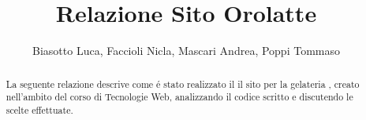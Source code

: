 \documentclass{article}
\title{Relazione Sito Orolatte}
\author{Biasotto Luca, Faccioli Nicla, Mascari Andrea, Poppi Tommaso}
\date{}
\begin{document}
\maketitle
\begin{abstract}
La seguente relazione descrive come \'e stato realizzato il il sito per la gelateria , creato nell'ambito del corso di Tecnologie Web, analizzando il codice scritto e discutendo le scelte effettuate.
\end{abstract}
\pagebreak
\tableofcontents
\pagebreak

 
 \pagebreak
 
 \pagebreak
 
 \pagebreak
 
\end{document}

